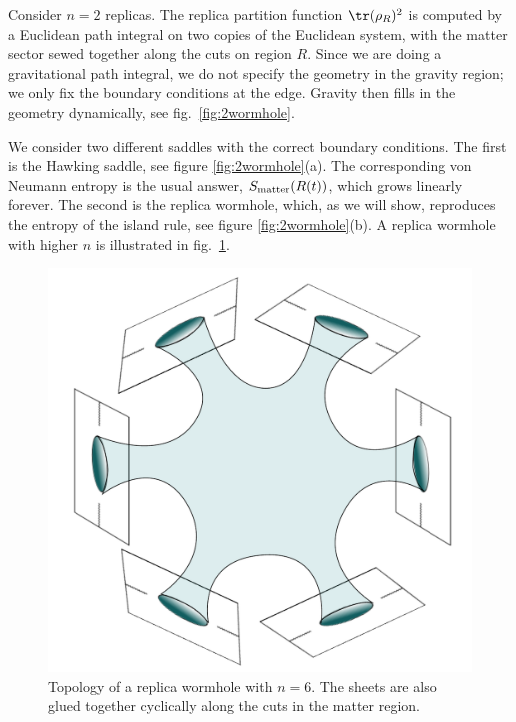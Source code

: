 Consider $n=2$ replicas. The replica partition function $\tr (\rho_R)^2$ is computed by a Euclidean path integral on two copies of the Euclidean system, with the matter sector sewed together along the cuts on region $R$. Since we are doing a gravitational path integral, we do not specify the geometry in the gravity region; we only fix the boundary conditions at the edge. Gravity then fills in the geometry  dynamically, see fig.~\ref{fig:2wormhole}. 

We consider two different saddles with the correct boundary conditions.  The first is the Hawking saddle, see
figure  \ref{fig:2wormhole}(a). The corresponding von Neumann entropy is the usual answer, $S_{\rm matter}(R(t))$, which grows linearly forever. The second is the replica wormhole, which, as we will show,  reproduces the entropy of the island rule, see figure  \ref{fig:2wormhole}(b). A replica wormhole with higher $n$ is illustrated in fig.~\ref{fig:manyreplicas}.


\begin{figure}
\begin{center}
\includegraphics[scale=0.4]{figures/manyreplicas.pdf}
\end{center}
\caption{\small Topology of a replica wormhole with $n=6$. The sheets are also glued together cyclically along the cuts in the matter region. \label{fig:manyreplicas}}
\end{figure}



